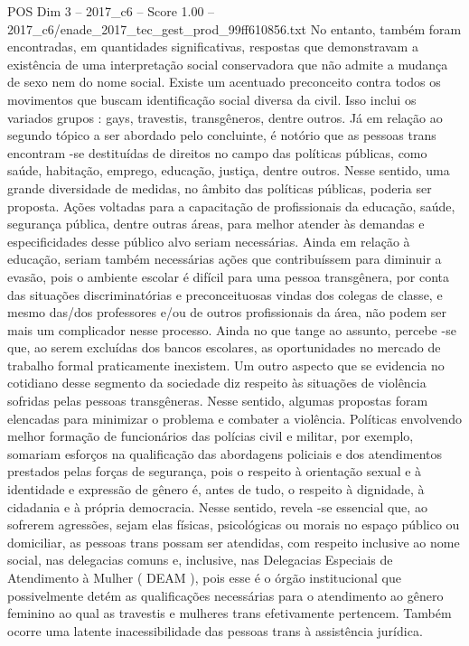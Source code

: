 \begin{textsample}{POS Dim 3 – 2017\_c6 – Score 1.00 – 2017\_c6/enade\_2017\_tec\_gest\_prod\_99ff610856.txt}
No entanto, também foram encontradas, em quantidades significativas, respostas que demonstravam a existência de uma interpretação social conservadora que não admite a mudança de sexo nem do nome social.
Existe um acentuado preconceito contra todos os movimentos que buscam identificação social diversa da civil.
Isso inclui os variados grupos : gays, travestis, transgêneros, dentre outros.
Já em relação ao segundo tópico a ser abordado pelo concluinte, é notório que as pessoas trans encontram -se destituídas de direitos no campo das políticas públicas, como saúde, habitação, emprego, educação, justiça, dentre outros.
Nesse sentido, uma grande diversidade de medidas, no âmbito das políticas públicas, poderia ser proposta.
Ações voltadas para a capacitação de profissionais da educação, saúde, segurança pública, dentre outras áreas, para melhor atender às demandas e especificidades desse público alvo seriam necessárias.
Ainda em relação à educação, seriam também necessárias ações que contribuíssem para diminuir a evasão, pois o ambiente escolar é difícil para uma pessoa transgênera, por conta das situações discriminatórias e preconceituosas vindas dos colegas de classe, e mesmo das/dos professores e/ou de outros profissionais da área, não podem ser mais um complicador nesse processo.
Ainda no que tange ao assunto, percebe -se que, ao serem excluídas dos bancos escolares, as oportunidades no mercado de trabalho formal praticamente inexistem.
Um outro aspecto que se evidencia no cotidiano desse segmento da sociedade diz respeito às situações de violência sofridas pelas pessoas transgêneras.
Nesse sentido, algumas propostas foram elencadas para minimizar o problema e combater a violência.
Políticas envolvendo melhor formação de funcionários das polícias civil e militar, por exemplo, somariam esforços na qualificação das abordagens policiais e dos atendimentos prestados pelas forças de segurança, pois o respeito à orientação sexual e à identidade e expressão de gênero é, antes de tudo, o respeito à dignidade, à cidadania e à própria democracia.
Nesse sentido, revela -se essencial que, ao sofrerem agressões, sejam elas físicas, psicológicas ou morais no espaço público ou domiciliar, as pessoas trans possam ser atendidas, com respeito inclusive ao nome social, nas delegacias comuns e, inclusive, nas Delegacias Especiais de Atendimento à Mulher ( DEAM ), pois esse é o órgão institucional que possivelmente detém as qualificações necessárias para o atendimento ao gênero feminino ao qual as travestis e mulheres trans efetivamente pertencem.
Também ocorre uma latente inacessibilidade das pessoas trans à assistência jurídica.

\end{textsample}
